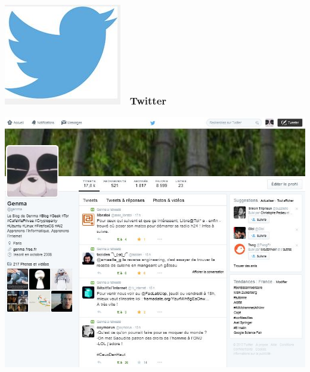 \documentclass{beamer}
\begin{document}
\begin{frame}
\frametitle{\includegraphics[scale=0.2] {./images/twitter_logo.jpg}~ Twitter}
\begin{center}
\includegraphics[scale=0.6] {./images/twitter_capture.jpg} 
\end{center}
\end{frame}
\end{document}
